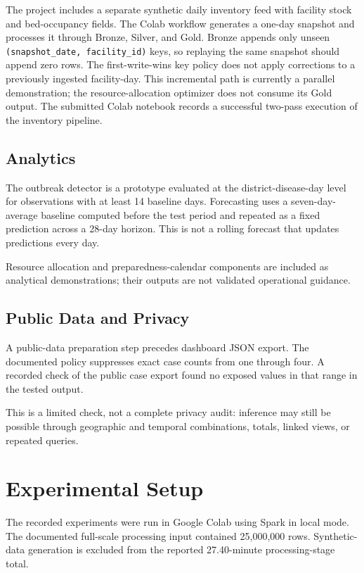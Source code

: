 ﻿\documentclass[conference]{IEEEtran}
\begin{document}
The project includes a separate synthetic daily inventory feed with facility stock and bed-occupancy fields. The Colab workflow generates a one-day snapshot and processes it through Bronze, Silver, and Gold. Bronze appends only unseen \texttt{(snapshot\_date, facility\_id)} keys, so replaying the same snapshot should append zero rows. The first-write-wins key policy does not apply corrections to a previously ingested facility-day. This incremental path is currently a parallel demonstration; the resource-allocation optimizer does not consume its Gold output. The submitted Colab notebook records a successful two-pass execution of the inventory pipeline.

\subsection{Analytics}

The outbreak detector is a prototype evaluated at the district-disease-day level for observations with at least 14 baseline days. Forecasting uses a seven-day-average baseline computed before the test period and repeated as a fixed prediction across a 28-day horizon. This is not a rolling forecast that updates predictions every day.

Resource allocation and preparedness-calendar components are included as analytical demonstrations; their outputs are not validated operational guidance.

\subsection{Public Data and Privacy}

A public-data preparation step precedes dashboard JSON export. The documented policy suppresses exact case counts from one through four. A recorded check of the public case export found no exposed values in that range in the tested output.

This is a limited check, not a complete privacy audit: inference may still be possible through geographic and temporal combinations, totals, linked views, or repeated queries.

\section{Experimental Setup}

The recorded experiments were run in Google Colab using Spark in local mode. The documented full-scale processing input contained 25,000,000 rows. Synthetic-data generation is excluded from the reported 27.40-minute processing-stage total.
\end{document}
